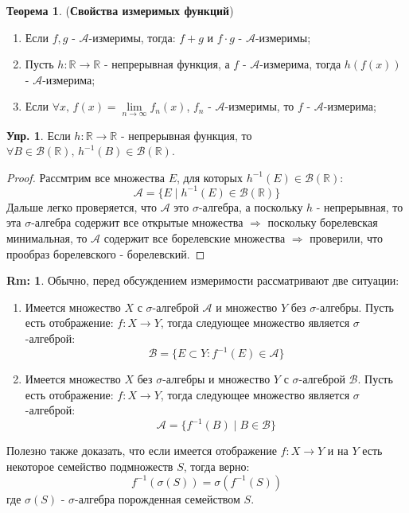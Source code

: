 \documentclass[12pt]{article}
\newcommand{\MR}{\mathbb{R}}
\newcommand{\MA}{\mathcal{A}}
\newcommand{\MB}{\mathcal{B}}
\theoremstyle{definition}
\newtheorem{rem}{Rm:}
\newtheorem{exrc}{Упр.}
\newtheorem{theorem}{Теорема}
\begin{document}
\begin{theorem}(\textbf{Свойства измеримых функций})
	\begin{enumerate}[label = \arabic*)]
		\item Если $f,g$ - $\MA$-измеримы, тогда: $f + g$ и $f{\cdot}g$ - $\MA$-измеримы;
		\item Пусть $h\colon \MR \to \MR$ - непрерывная функция, а $f$ - $\MA$-измерима, тогда $h(f(x))$ - $\MA$-измерима;
		\item Если $\forall x, \, f(x) = \lim\limits_{n \to \infty}f_n(x)$, $f_n$ - $\MA$-измеримы, то $f$ - $\MA$-измерима;
	\end{enumerate}
\end{theorem}

\begin{exrc}
	Если $h \colon \MR \to \MR$ - непрерывная функция, то $\forall B \in \MB(\MR), \, h^{-1}(B) \in \MB(\MR)$.
\end{exrc}
\begin{proof}
	Рассмтрим все множества $E$, для которых $h^{-1}(E) \in \MB(\MR)$:
	$$
		\MA = \{E \mid h^{-1}(E) \in \MB(\MR)\}
	$$
	Дальше легко проверяется, что $\MA$ это $\sigma$-алгебра, а поскольку $h$ - непрерывная, то эта $\sigma$-алгебра содержит все открытые множества $\Rightarrow$ поскольку борелевская минимальная, то $\MA$ содержит все борелевские множества $\Rightarrow$ проверили, что прообраз борелевского - борелевский.
\end{proof}

\begin{rem}
	Обычно, перед обсуждением измеримости рассматривают две ситуации:
	\begin{enumerate}[label = (\arabic*)]
		\item Имеется множество $X$ с $\sigma$-алгеброй $\MA$ и множество $Y$ без $\sigma$-алгебры. Пусть есть отображение: $f\colon X \to Y$, тогда следующее множество является $\sigma$-алгеброй:
		$$
			 \MB = \{E \subset Y \colon f^{-1}(E) \in \MA\}
		$$
		\item Имеется множество $X$ без $\sigma$-алгебры и множество $Y$ с $\sigma$-алгеброй $\MB$. Пусть есть отображение: $f\colon X \to Y$, тогда следующее множество является $\sigma$-алгеброй:
		$$
			\MA = \{f^{-1}(B) \mid B \in \MB \}
		$$
	\end{enumerate}
	Полезно также доказать, что если имеется отображение $f\colon X \to Y$ и на $Y$ есть некоторое семейство подмножеств $S$, тогда верно:
	$$
		f^{-1}(\sigma(S)) = \sigma(f^{-1}(S))
	$$
	где $\sigma(S)$ - $\sigma$-алгебра порожденная семейством $S$.
\end{rem}
\end{document}
